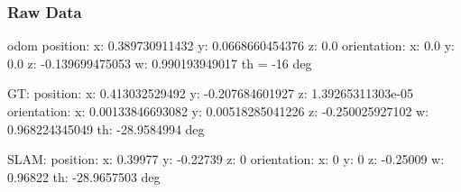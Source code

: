  \subsubsection*{Raw Data}


\begin{DoxyCode}
odom
position:
  x: 0.389730911432
  y: 0.0668660454376
  z: 0.0
orientation:
  x: 0.0
  y: 0.0
  z: -0.139699475053
  w: 0.990193949017
  th = -16 deg

GT:
position:
  x: 0.413032529492
  y: -0.207684601927
  z: 1.39265311303e-05
orientation:
  x: 0.00133846693082
  y: 0.00518285041226
  z: -0.250025927102
  w: 0.968224345049
  th: -28.9584994 deg

SLAM:
position:
x: 0.39977
y: -0.22739
z: 0
orientation:
x: 0
y: 0
z: -0.25009
w: 0.96822
th: -28.9657503 deg
\end{DoxyCode}
 